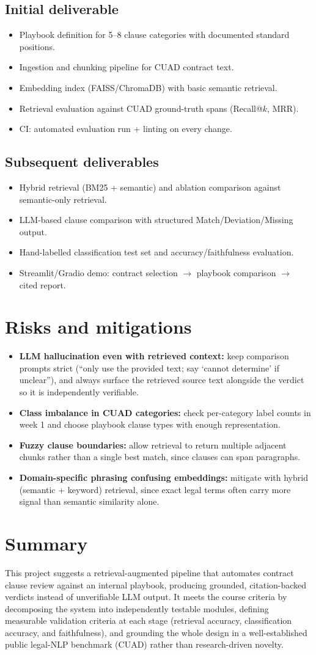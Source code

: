 \documentclass[11pt]{article}
\newcommand{\secx}[1]{\section{#1}}
\newcommand{\subsecx}[1]{\subsection{#1}}
\begin{document}
\subsecx{Initial deliverable}
\begin{itemize}
  \item Playbook definition for 5--8 clause categories with documented standard
  positions.
  \item Ingestion and chunking pipeline for CUAD contract text.
  \item Embedding index (FAISS/ChromaDB) with basic semantic retrieval.
  \item Retrieval evaluation against CUAD ground-truth spans (Recall@$k$, MRR).
  \item CI: automated evaluation run + linting on every change.
\end{itemize}

\subsecx{Subsequent deliverables}
\begin{itemize}
  \item Hybrid retrieval (BM25 + semantic) and ablation comparison against
  semantic-only retrieval.
  \item LLM-based clause comparison with structured Match/Deviation/Missing output.
  \item Hand-labelled classification test set and accuracy/faithfulness evaluation.
  \item Streamlit/Gradio demo: contract selection $\rightarrow$ playbook comparison
  $\rightarrow$ cited report.
\end{itemize}

\secx{Risks and mitigations}
\begin{itemize}
  \item \textbf{LLM hallucination even with retrieved context:} keep comparison
  prompts strict (``only use the provided text; say `cannot determine' if
  unclear''), and always surface the retrieved source text alongside the
  verdict so it is independently verifiable.
  \item \textbf{Class imbalance in CUAD categories:} check per-category label counts
  in week 1 and choose playbook clause types with enough representation.
  \item \textbf{Fuzzy clause boundaries:} allow retrieval to return multiple adjacent
  chunks rather than a single best match, since clauses can span paragraphs.
  \item \textbf{Domain-specific phrasing confusing embeddings:} mitigate with hybrid
  (semantic + keyword) retrieval, since exact legal terms often carry more
  signal than semantic similarity alone.
\end{itemize}

\secx{Summary}
This project suggests a retrieval-augmented pipeline that automates contract clause
review against an internal playbook, producing grounded, citation-backed verdicts
instead of unverifiable LLM output. It meets the course criteria by decomposing the
system into independently testable modules, defining measurable validation criteria
at each stage (retrieval accuracy, classification accuracy, and faithfulness), and
grounding the whole design in a well-established public legal-NLP benchmark (CUAD)
rather than research-driven novelty.
\end{document}
